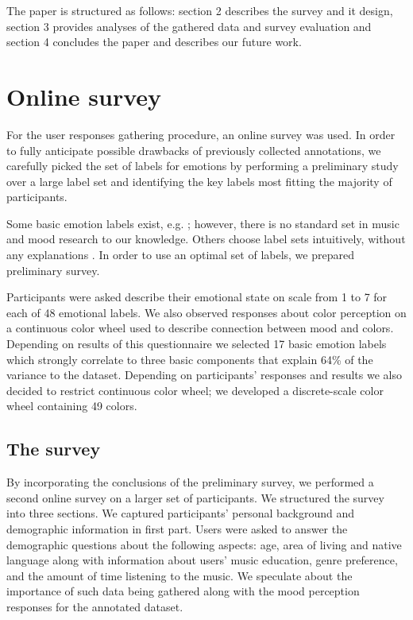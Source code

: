 \documentclass[a4paper]{article}
\begin{document}
The paper is structured as follows: section 2 describes the survey and it design, section 3 provides analyses of the gathered data and survey evaluation and section 4 concludes the paper and describes our future work.


\section{Online survey}

For the user responses gathering procedure, an online survey was used. In order to fully anticipate possible drawbacks of previously collected annotations, we carefully picked the set of labels for emotions by performing a preliminary study over a large label set and identifying the key labels most fitting the majority of participants.

Some basic emotion labels exist, e.g. \cite{dalgleish1999handbook}; however, there is no standard set in music and mood research to our knowledge. Others choose label sets intuitively, without any explanations \cite{wu2013spectral}. In order to use an optimal set of labels, we prepared preliminary survey.

Participants were asked describe their emotional state on scale from 1 to 7 for each of 48 emotional labels. We also observed responses about color perception on a continuous color wheel used to describe connection between mood and colors. Depending on results of this questionnaire we selected 17 basic emotion labels which strongly correlate to three basic components that explain 64\% of the variance to the dataset. Depending on participants' responses and results we also decided to restrict continuous color wheel; we developed a discrete-scale color wheel containing 49 colors. 

\subsection{The survey}

By incorporating the conclusions of the preliminary survey, we performed a second  online survey on a larger set of participants. We structured the survey into three sections. We captured participants' personal background and demographic information in first part. Users were asked to answer the demographic questions about the following aspects: age, area of living and native language along with information about users' music education, genre preference, and the amount of time listening to the music. We speculate about the importance of such data being gathered along with the mood perception responses for the annotated dataset. 
\end{document}
